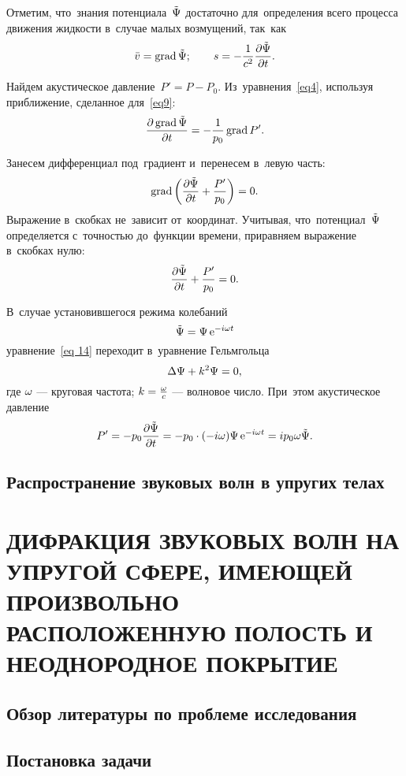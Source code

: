 Отметим, что~знания потенциала~$\tilde\P$ достаточно для~определения всего процесса движения жидкости в~случае малых возмущений, так~как
$$
\bar{v}=\grad\tilde\P;\qq s=-\fr{1}{c^2}\fr{\de\tilde\P}{\de t}.
$$

Найдем акустическое давление~$P'=P-P_0$. Из~уравнения~\eqref{eq4}, используя приближение, сделанное для~\eqref{eq9}:
$$
\fr{\de \grad \tilde\P}{\de t} = - \fr{1}{p_0}\grad P'.
$$

Занесем дифференциал под~градиент и~перенесем в~левую часть:
$$
\grad \left(\fr{\de \tilde\P}{\de t} + \fr{P'}{p_0}\right) = 0.
$$
Выражение в~скобках не~зависит от~координат. Учитывая, что~потенциал~$\tilde\P$ определяется с~точностью до~функции времени, приравняем выражение в~скобках нулю:
$$
\fr{\de \tilde\P}{\de t} + \fr{P'}{p_0} = 0.
$$

В~случае установившегося режима колебаний
\begin{equation}\label{eq 15}
\tilde\P=\P \e^{-i\om t}
\end{equation}
уравнение~\eqref{eq 14} переходит в~уравнение Гельмгольца
\begin{equation}\label{eq 16}
\Lap{\P}+k^2\P=0,
\end{equation}
где $\om$ --- круговая частота; $k=\fr{\om}{c}$ --- волновое число.
При~этом акустическое давление 
$$
P'=-p_0 \fr{\de \tilde\P}{\de t}=-p_0 \cdot (-i \om) \P \e^{-i\omega t}=ip_0\om\tilde{\P}.
$$


\newpage
\subsection{Распространение звуковых волн в упругих телах}


\newpage
\section{ДИФРАКЦИЯ ЗВУКОВЫХ ВОЛН НА УПРУГОЙ СФЕРЕ, ИМЕЮЩЕЙ ПРОИЗВОЛЬНО РАСПОЛОЖЕННУЮ ПОЛОСТЬ И НЕОДНОРОДНОЕ ПОКРЫТИЕ}

\newpage
\subsection{Обзор литературы по проблеме исследования}

\newpage
\subsection{Постановка задачи}

